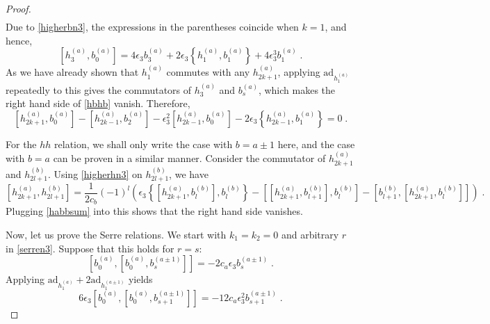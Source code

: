 \documentclass[11pt]{article}
\numberwithin{equation}{section}
\numberwithin{figure}{section}
\numberwithin{table}{section}
\begin{document}
\begin{proof}
\begin{align}
\end{align}
Due to \eqref{higherbn3}, the expressions in the parentheses coincide when $k=1$, and hence,
\begin{equation}
	\left[h^{(a)}_3,b^{(a)}_0\right]=4\epsilon_3b^{(a)}_3+2\epsilon_3\left\{h^{(a)}_1,b^{(a)}_1\right\}+4\epsilon_3^3b^{(a)}_1\;.
\end{equation}
As we have already shown that $h^{(a)}_1$ commutes with any $h^{(a)}_{2k+1}$, applying $\mathrm{ad}_{h^{(a)}_1}$ repeatedly to this gives the commutators of $h^{(a)}_3$ and $b^{(a)}_s$, which makes the right hand side of \eqref{hbhb} vanish. Therefore,
\begin{equation}
	\left[h^{(a)}_{2k+1},b^{(a)}_0\right]-\left[h^{(a)}_{2k-1},b^{(a)}_2\right]-\epsilon_3^2\left[h^{(a)}_{2k-1},b^{(a)}_0\right]-2\epsilon_3\left\{h^{(a)}_{2k-1},b^{(a)}_1\right\}=0\;.
\end{equation}

For the $hh$ relation, we shall only write the case with $b=a\pm1$ here, and the case with $b=a$ can be proven in a similar manner. Consider the commutator of $h^{(a)}_{2k+1}$ and $h^{(b)}_{2l+1}$. Using \eqref{higherhn3} on $h^{(b)}_{2l+1}$, we have
\begin{equation}
	\left[h^{(a)}_{2k+1},h^{(b)}_{2l+1}\right]=\frac{1}{2c_b}(-1)^l\left(\epsilon_3\left\{\left[h^{(a)}_{2k+1},b^{(b)}_l\right],b^{(b)}_l\right\}-\left[\left[h^{(a)}_{2k+1},b^{(b)}_{l+1}\right],b^{(b)}_l\right]-\left[b^{(b)}_{l+1},\left[h^{(a)}_{2k+1},b^{(b)}_l\right]\right]\right)\;.
\end{equation}
Plugging \eqref{habbsum} into this shows that the right hand side vanishes.

Now, let us prove the Serre relations. We start with $k_1=k_2=0$ and arbitrary $r$ in \eqref{serren3}. Suppose that this holds for $r=s$:
\begin{equation}
	\left[b^{(a)}_0,\left[b^{(a)}_0,b^{(a\pm1)}_s\right]\right]=-2c_a\epsilon_3b^{(a\pm1)}_s\;.
\end{equation}
Applying $\mathrm{ad}_{h^{(a)}_1}+2\mathrm{ad}_{h^{(a\pm1)}_1}$ yields
\begin{equation}
	6\epsilon_3\left[b^{(a)}_0,\left[b^{(a)}_0,b^{(a\pm1)}_{s+1}\right]\right]=-12c_a\epsilon_3^2b^{(a\pm1)}_{s+1}\;.
\end{equation}


\end{proof}
\end{document}
